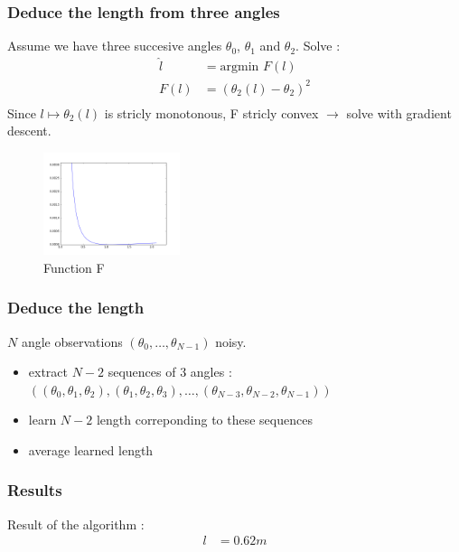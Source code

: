 \documentclass{beamer}
\begin{document}
\begin{frame}
\frametitle{Deduce the length from three angles}
Assume we have three succesive angles $\theta_0$, $\theta_1$ and $\theta_2$.
Solve :
\begin{align*}
  \hat{l} &= \text{argmin } F(l)\\
  F(l) &= \left( \theta_2(l) - \theta_2 \right)^2\\
\end{align*}
Since $l \mapsto \theta_2(l)$ is stricly monotonous, F stricly convex $\rightarrow$ solve with gradient descent.
\begin{figure}
  \captionsetup{labelformat=empty}
  \includegraphics[height=3cm]{F.png}
  \caption{Function F}
\end{figure}
\end{frame}

\begin{frame}
\frametitle{Deduce the length}
$N$ angle observations $(\theta_0, \ldots, \theta_{N-1})$ noisy.
\begin{itemize}
  \item extract $N-2$ sequences of 3 angles :
    $\left( (\theta_0, \theta_1, \theta_2), (\theta_1, \theta_2, \theta_3), \ldots , (\theta_{N-3}, \theta_{N-2}, \theta_{N-1}) \right)$
  \item learn $N-2$ length correponding to these sequences
  \item average learned length
\end{itemize}
\end{frame}

\begin{frame}
\frametitle{Results}
  Result of the algorithm :
  \begin{align*}
    l  &= 0.62m \\
  \end{align*}
\end{frame}
\end{document}
